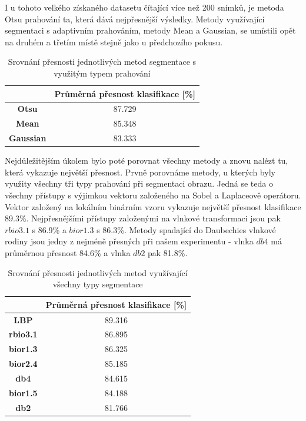 I u tohoto velkého získaného datasetu čítající více než 200 snímků, je metoda Otsu prahování ta, která dává nejpřesnější výsledky. Metody využívající segmentaci s adaptivním prahováním, metody Mean a Gaussian, se umístili opět na druhém a třetím místě stejně jako u předchozího pokusu.

\capstartfalse
\begin{table}[!htbp]
\centering
\begin{tabular}{|c|c|}
\hline
                  & \textbf{Průměrná přesnost klasifikace {[}\%{]}} \\ \hline
\textbf{Otsu}     & 87.729                                         \\ \hline
\textbf{Mean}     & 85.348                                         \\ \hline
\textbf{Gaussian} & 83.333                                         \\ \hline
\end{tabular}
\caption{Srovnání přesnosti jednotlivých metod segmentace s využitým typem prahování}
\end{table}
\capstarttrue

Nejdůležitějším úkolem bylo poté porovnat všechny metody a znovu nalézt tu, která vykazuje největší přesnost. Prvně porovnáme metody, u kterých byly využity všechny tři typy prahování při segmentaci obrazu. Jedná se teda o všechny přístupy s výjimkou vektoru založeného na Sobel a Laplaceově operátoru. Vektor založený na lokálním binárním vzoru vykazuje největší přesnost klasifikace 89.3\%. Nejpřesnějšími přístupy založenými na vlnkové transformaci jsou pak $rbio3.1$ s 86.9\% a $bior1.3$ s 86.3\%. Metody spadající do Daubechies vlnkové rodiny jsou jedny z nejméně přesných při našem experimentu - vlnka $db4$ má průměrnou přesnost 84.6\% a vlnka $db2$ pak 81.8\%.

\capstartfalse
\begin{table}[!htbp]
\centering
\begin{tabular}{|c|c|}
\hline
                 & \textbf{Průměrná přesnost klasifikace {[}\%{]}} \\ \hline
\textbf{LBP}     & 89.316                                         \\ \hline
\textbf{rbio3.1} & 86.895                                         \\ \hline
\textbf{bior1.3} & 86.325                                         \\ \hline
\textbf{bior2.4} & 85.185                                         \\ \hline
\textbf{db4}     & 84.615                                         \\ \hline
\textbf{bior1.5} & 84.188                                         \\ \hline
\textbf{db2}     & 81.766                                         \\ \hline
\end{tabular}
\caption{Srovnání přesnosti jednotlivých metod využívající všechny typy segmentace}
\end{table}
\capstarttrue

